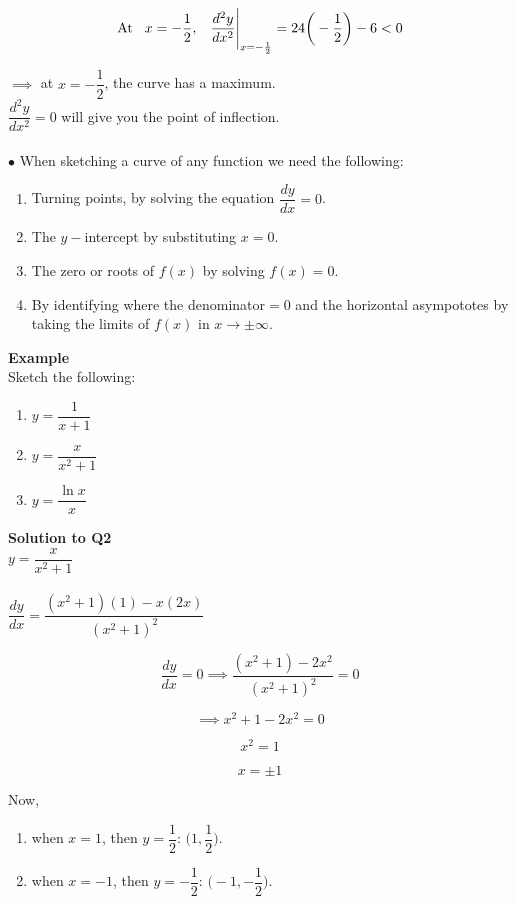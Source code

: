 \documentclass[11pt,a4paper]{article}
\begin{document}
$$\text{At}\hspace{0.3cm} x=-\frac{1}{2},\hspace{0.3cm} \frac{d^2y}{dx^2}\Bigg|_{x=-\frac{1}{2}}=24\bigg(-\dfrac{1}{2}\bigg)-6<0$$

$\implies$ at $x=-\dfrac{1}{2}$, the curve has a maximum.\\

$\dfrac{d^2y}{dx^2}=0$ will give you the point of inflection.\\\\



$\bullet$ When sketching a curve of any function we need the following:
\begin{enumerate}
\item Turning points, by solving the equation $\dfrac{dy}{dx}=0$.
\item The $y-$intercept by substituting $x=0$.
\item The zero or roots of $f(x)$ by solving $f(x)=0$.
\item By identifying where the denominator$=0$ and the horizontal asympototes by taking the limits of $f(x)$ in $x\longrightarrow \pm \infty$.\\
\end{enumerate}



\textbf{Example}\\
Sketch the following:
\begin{enumerate}
\item $y=\dfrac{1}{x+1}$

\item $y=\dfrac{x}{x^2+1}$

\item $y=\dfrac{\ln x}{x}$\\
\end{enumerate}


\textbf{Solution to Q2}\\

$y=\dfrac{x}{x^2+1}$\\\\

$\dfrac{dy}{dx}=\dfrac{(x^2+1)(1)-x(2x)}{(x^2+1)^2}$

$$\frac{dy}{dx}=0\implies \frac{(x^2+1)-2x^2}{(x^2+1)^2}=0$$

$$\implies x^2+1-2x^2=0$$

$$x^2=1$$

$$x=\pm 1$$

Now,
\begin{enumerate}
\item[] when $x=1$, then $y=\dfrac{1}{2}$: $\bigg(1,\dfrac{1}{2}\bigg)$.

\item[] when $x=-1$, then $y=-\dfrac{1}{2}$: $\bigg(-1,-\dfrac{1}{2}\bigg)$.\\
\end{enumerate}
\end{document}
